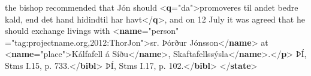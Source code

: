 \begin{shaded}
\hspace*{1em}\hspace*{1em} the bishop recommended that Jón should {<\textbf{q}\hspace*{1em}{xml:lang}="{da}">}promoveres til andet bedre kald, end det hand hidindtil\mbox{}\newline 
\hspace*{1em}\hspace*{1em}\hspace*{1em}\hspace*{1em} har havt{</\textbf{q}>}, and on 12 July it was agreed that he should exchange livings with {<\textbf{name}\hspace*{1em}{type}="{person}"\mbox{}\newline 
\hspace*{1em}\hspace*{1em}\hspace*{1em}{ref}="{tag:projectname.org,2012:ThorJon}">}sr. Þórður Jónsson{</\textbf{name}>} at {<\textbf{name}\hspace*{1em}{type}="{place}">}Kálfafell á Síðu{</\textbf{name}>},\mbox{}\newline 
{}Skaftafellssýsla{</\textbf{name}>}.{</\textbf{p}>}\mbox{}\newline 
{}ÞÍ, Stms I.15, p. 733.{</\textbf{bibl}>}\mbox{}\newline 
{}ÞÍ, Stms I.17, p.\mbox{}\newline 
\hspace*{1em}\hspace*{1em} 102.{</\textbf{bibl}>}\mbox{}\newline 
{</\textbf{state}>}\end{shaded}\egroup\par \par
